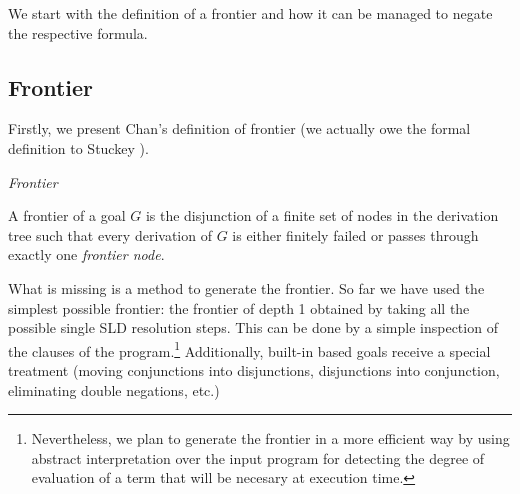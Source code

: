 \documentclass{llncs}
\newcommand{\naf}{{\em naf}}\newcommand{\viejo}[1]{}
\begin{document}


We start with the definition of a frontier and how it can be managed
to negate the respective formula.

\vspace{-0.1in}

\subsection{Frontier}
\label{frontier}

Firstly, we present Chan's definition of frontier (we actually owe the formal
definition to Stuckey \cite{Stuckey95}).

\begin{definition}{\em Frontier}

A frontier of a goal $G$ is the disjunction of a finite set of nodes
in the derivation tree such that every derivation of $G$ is either
finitely failed or passes through exactly one {\em frontier node}.
\end{definition}

What is missing is a method to generate the frontier. So far we have
used the simplest possible frontier: the frontier of depth 1 obtained
by taking all the possible single SLD resolution steps. This can be
done by a simple inspection of the clauses of the
program.\footnote{Nevertheless, we plan to generate the frontier in a
more efficient way by using abstract interpretation over the input
program for detecting the degree of evaluation of a term that will be
necesary at execution time.} Additionally, built-in based goals
receive a special treatment (moving conjunctions into disjunctions,
disjunctions into conjunction, eliminating double negations, etc.)
\end{document}
